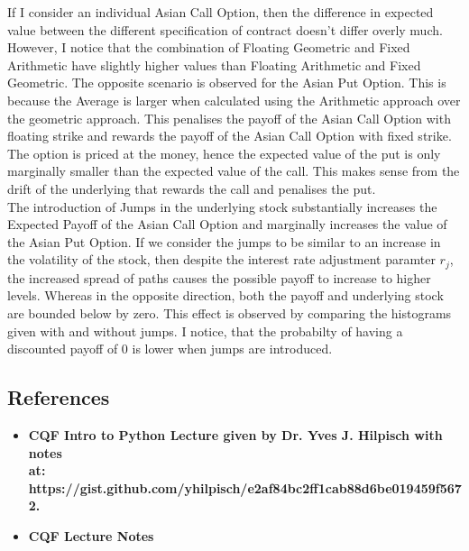 \documentclass{report}
\theoremstyle{plain}
\theoremstyle{definition}
\begin{document}
If I consider an individual Asian Call Option, then the difference in expected value between the different specification of contract doesn't differ overly much. However, I notice that the combination of Floating Geometric and Fixed Arithmetic have slightly higher values than Floating Arithmetic and Fixed Geometric. The opposite scenario is observed for the Asian Put Option. This is because the Average is larger when calculated using the Arithmetic approach over the geometric approach. This penalises the payoff of the Asian Call Option with floating strike and rewards the payoff of the Asian Call Option with fixed strike.\newline
\\
The option is priced at the money, hence the expected value of the put is only marginally smaller than the expected value of the call. This makes sense from the drift of the underlying that rewards the call and penalises the put.\newline
\\
The introduction of Jumps in the underlying stock substantially increases the Expected Payoff of the Asian Call Option and marginally increases the value of the Asian Put Option. If we consider the jumps to be similar to an increase in the volatility of the stock, then despite the interest rate adjustment paramter $r_j$, the increased spread of paths causes the possible payoff to increase to higher levels. Whereas in the opposite direction, both the payoff and underlying stock are bounded below by zero. This effect is observed  by comparing the histograms given with and without jumps. I notice, that the probabilty of having a discounted payoff of 0 is lower when jumps are introduced.

\subsection*{References}

\begin{itemize}
  \item \textbf{CQF Intro to Python Lecture given by Dr. Yves J. Hilpisch with notes\\at: https://gist.github.com/yhilpisch/e2af84bc2ff1cab88d6be019459f5672.}

  \item \textbf{CQF Lecture Notes}
\end{itemize}
\end{document}
